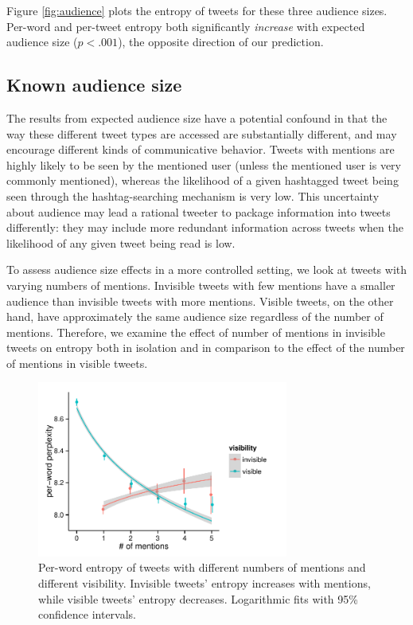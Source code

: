 \documentclass[11pt,letterpaper]{article}
\begin{document}
Figure \ref{fig:audience} plots the entropy of tweets for these three audience sizes.  Per-word and per-tweet entropy both significantly {\it increase} with expected audience size ($p < .001$), the opposite direction of our prediction. 

\subsection{Known audience size}

The results from expected audience size have a potential confound in that the way these different tweet types are accessed are substantially different, and may encourage different kinds of communicative behavior.  Tweets with mentions are highly likely to be seen by the mentioned user (unless the mentioned user is very commonly mentioned), whereas the likelihood of a given hashtagged tweet being seen through the hashtag-searching mechanism is very low.  This uncertainty about audience may lead a rational tweeter to package information into tweets differently: they may include more redundant information across tweets when the likelihood of any given tweet being read is low.

To assess audience size effects in a more controlled setting, we look at tweets with varying numbers of mentions.  Invisible tweets with few mentions have a smaller audience than invisible tweets with more mentions.  Visible tweets, on the other hand, have approximately the same audience size regardless of the number of mentions.  Therefore, we examine the effect of number of mentions in invisible tweets on entropy both in isolation and in comparison to the effect of the number of mentions in visible tweets.

\begin{figure}[t]
 \centering
  \includegraphics[width=3.25in]{figures/cmcl-mentions-pw2.pdf}
 \caption{Per-word entropy of tweets with different numbers of mentions and different visibility.  Invisible tweets' entropy increases with mentions, while visible tweets' entropy decreases.  Logarithmic fits with 95\% confidence intervals.}\label{fig:mentions}\vspace*{-.5em}
\end{figure}
\end{document}
